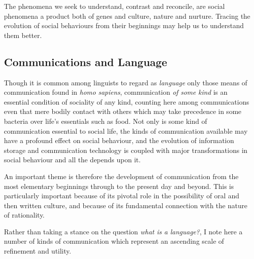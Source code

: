 \documentclass[10pt,titlepage]{article}
\begin{document}
The phenomena we seek to understand, contrast and reconcile, are social phenomena a product both of genes and culture, nature and nurture.
Tracing the evolution of social behaviours from their beginnings may help us to understand them better.

\subsection{Communications and Language}

Though it is common among linguists to regard as \emph{language} only those means of communication found in \emph{homo sapiens}, communication \emph{of some kind} is an essential condition of sociality of any kind, counting here among communications even that mere bodily contact with others which may take precedence in some bacteria over life's essentials such as food.
Not only is some kind of communication essential to social life, the kinds of communication available may have a profound effect on social behaviour, and the evolution of information storage and communication technology is coupled with major transformations in social behaviour and all the depends upon it.

An important theme is therefore the development of communication from the most elementary beginnings through to the present day and beyond.
This is particularly important because of its pivotal role in the possibility of oral and then written culture, and because of its fundamental connection with the nature of rationality.

Rather than taking a stance on the question \emph{what is a language?}, I note here a number of kinds of communication which represent an ascending scale of refinement and utility.
\end{document}
